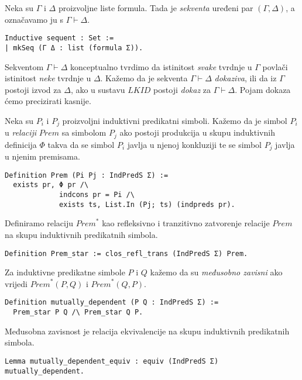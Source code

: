 \begin{definition}
  Neka su \(\Gamma\) i \(\Delta\) proizvoljne liste formula. Tada je \textit{sekventa} uređeni par \((\Gamma,\Delta)\), a označavamo ju s \(\Gamma \vdash \Delta\).
\begin{verbatim}
Inductive sequent : Set :=
| mkSeq (Γ Δ : list (formula Σ)).
\end{verbatim}
\end{definition}
\noindent Sekventom \(\Gamma \vdash \Delta\) konceptualno tvrdimo da istinitost \textit{svake}
tvrdnje u \(\Gamma\) povlači istinitost \textit{neke} tvrdnje u \(\Delta\).
Kažemo da je sekventa \(\Gamma \vdash \Delta\) \textit{dokaziva}, ili da iz \(\Gamma\) postoji izvod za \(\Delta\), ako u sustavu \(\mathit{LKID}\) postoji \textit{dokaz} za \(\Gamma \vdash \Delta\). Pojam dokaza ćemo precizirati kasnije.

\begin{definition}
  Neka su \(P_{i}\) i \(P_{j}\) proizvoljni induktivni predikatni simboli.
  Kažemo da je simbol \(P_{i}\) u \textit{relaciji} \(\mathit{Prem}\) sa simbolom \(P_{j}\)
  ako postoji produkcija u skupu induktivnih definicija \(\Phi\) takva da
  se simbol \(P_{i}\) javlja u njenoj konkluziji te
  se simbol \(P_{j}\) javlja u njenim premisama.
\begin{verbatim}
Definition Prem (Pi Pj : IndPredS Σ) :=
  exists pr, Φ pr /\
             indcons pr = Pi /\
             exists ts, List.In (Pj; ts) (indpreds pr).
\end{verbatim}
\end{definition}

\begin{definition}
  Definiramo relaciju \(\mathit{Prem}^{\ast}\) kao refleksivno i tranzitivno zatvorenje relacije \(\mathit{Prem}\) na skupu induktivnih predikatnih simbola.
\begin{verbatim}
Definition Prem_star := clos_refl_trans (IndPredS Σ) Prem.
\end{verbatim}
  \noindent Za induktivne predikatne simbole \(P\) i \(Q\) kažemo da su
  \textit{međusobno zavisni} ako vrijedi \(\mathit{Prem}^{\ast}(P, Q)\) i \(\mathit{Prem}^{\ast}(Q, P)\).
\begin{verbatim}
Definition mutually_dependent (P Q : IndPredS Σ) :=
  Prem_star P Q /\ Prem_star Q P.
\end{verbatim}
\end{definition}

\begin{lemma}
  Međusobna zavisnost je relacija ekvivalencije na skupu induktivnih predikatnih simbola.
\begin{verbatim}
Lemma mutually_dependent_equiv : equiv (IndPredS Σ) mutually_dependent.
\end{verbatim}
\end{lemma}

